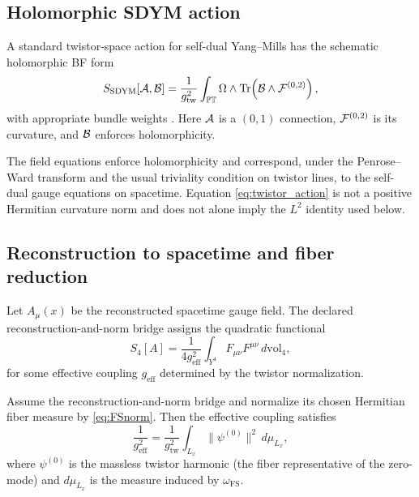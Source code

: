 \documentclass[11pt]{article}
\begin{document}
\subsection{Holomorphic SDYM action}

A standard twistor-space action for self-dual Yang--Mills has the schematic
holomorphic BF form
\begin{equation}
S_{\mathrm{SDYM}}[{\cal A},{\cal B}]
=
\frac{1}{g_{\mathrm{tw}}^2}
\int_{\mathbb{PT}}
\Omega\wedge\mathrm{Tr}\!\left(
{\cal B}\wedge{\cal F}^{(0,2)}
\right),
\label{eq:twistor_action}
\end{equation}
with appropriate bundle weights \cite{Mason2005,Movshev2008}. Here ${\cal A}$
is a $(0,1)$ connection, ${\cal F}^{(0,2)}$ is its curvature, and ${\cal B}$
enforces holomorphicity.

The field equations enforce holomorphicity and correspond, under the
Penrose--Ward transform and the usual triviality condition on twistor lines,
to the self-dual gauge equations on spacetime. Equation
\eqref{eq:twistor_action} is not a positive Hermitian curvature norm and does
not alone imply the $L^2$ identity used below.

\subsection{Reconstruction to spacetime and fiber reduction}

Let $A_\mu(x)$ be the reconstructed spacetime gauge field. The declared
reconstruction-and-norm bridge assigns the quadratic functional
\begin{equation}
S_{4}[A]
=
\frac{1}{4g_{\mathrm{eff}}^2}
\int_{Y^4}
F_{\mu\nu}F^{\mu\nu}\,d\mathrm{vol}_4,
\label{eq:4d_action}
\end{equation}
for some effective coupling $g_{\mathrm{eff}}$ determined by the twistor normalization.

\begin{proposition}
Assume the reconstruction-and-norm bridge and normalize its chosen Hermitian
fiber measure by \eqref{eq:FSnorm}. Then
the effective coupling satisfies
\begin{equation}
\frac{1}{g_{\mathrm{eff}}^2}
=
\frac{1}{g_{\mathrm{tw}}^2}
\int_{L_x}
\|\psi^{(0)}\|^2\, d\mu_{L_x},
\label{eq:fiber_identity}
\end{equation}
where $\psi^{(0)}$ is the massless twistor harmonic (the fiber representative of the
zero-mode) and $d\mu_{L_x}$ is the measure induced by $\omega_{\mathrm{FS}}$.
\end{proposition}
\end{document}
